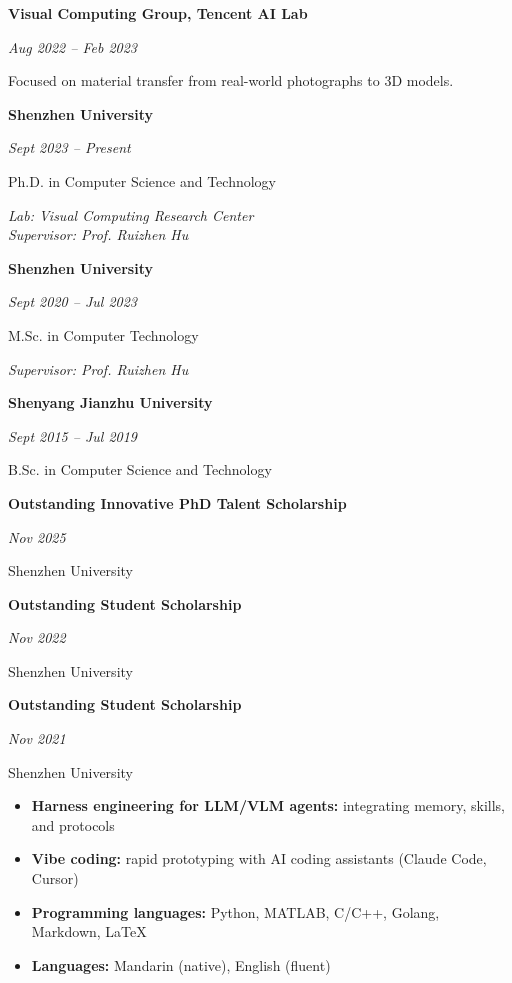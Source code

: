 \documentclass[10pt,a4paper,UTF8]{altacv}
\newcommand{\role}[3]{%
  \begin{minipage}[t]{0.72\linewidth}\raggedright\textbf{#1}\end{minipage}\hfill\begin{minipage}[t]{0.27\linewidth}\raggedleft\textit{#2}\end{minipage}\par
  \vspace{5pt}
  {#3}\par\vspace{10pt}
}
\newcommand{\edu}[4]{%
  \begin{minipage}[t]{0.72\linewidth}\raggedright\textbf{#1}\end{minipage}\hfill\begin{minipage}[t]{0.27\linewidth}\raggedleft\textit{#2}\end{minipage}\par
  \vspace{5pt}
  {#3}\par
  \ifstrequal{#4}{}{}{\textit{#4}\par}
  \vspace{10pt}
}
\newcommand{\award}[3]{%
  \begin{minipage}[t]{0.72\linewidth}\raggedright\textbf{#1}\end{minipage}\hfill\begin{minipage}[t]{0.27\linewidth}\raggedleft\textit{#3}\end{minipage}\par
  \vspace{5pt}
  {#2}\par\vspace{10pt}
}
\begin{document}
\role
  {Visual Computing Group, Tencent AI Lab}
  {Aug 2022 -- Feb 2023}
  {Focused on material transfer from real-world photographs to 3D models.}



\edu
  {Shenzhen University}
  {Sept 2023 -- Present}
  {Ph.D. in Computer Science and Technology}
  {Lab: Visual Computing Research Center\\Supervisor: Prof. Ruizhen Hu}

\edu
  {Shenzhen University}
  {Sept 2020 -- Jul 2023}
  {M.Sc. in Computer Technology}
  {Supervisor: Prof. Ruizhen Hu}

\edu
  {Shenyang Jianzhu University}
  {Sept 2015 -- Jul 2019}
  {B.Sc. in Computer Science and Technology}
  {}



\award
  {Outstanding Innovative PhD Talent Scholarship}
  {Shenzhen University}
  {Nov 2025}

\award
  {Outstanding Student Scholarship}
  {Shenzhen University}
  {Nov 2022}

\award
  {Outstanding Student Scholarship}
  {Shenzhen University}
  {Nov 2021}



\begin{itemize}
\item \textbf{Harness engineering for LLM/VLM agents:} integrating memory, skills, and protocols
\item \textbf{Vibe coding:} rapid prototyping with AI coding assistants (Claude Code, Cursor)
\item \textbf{Programming languages:} Python, MATLAB, C/C++, Golang, Markdown, LaTeX
\item \textbf{Languages:} Mandarin (native), English (fluent)
\end{itemize}
\end{document}
